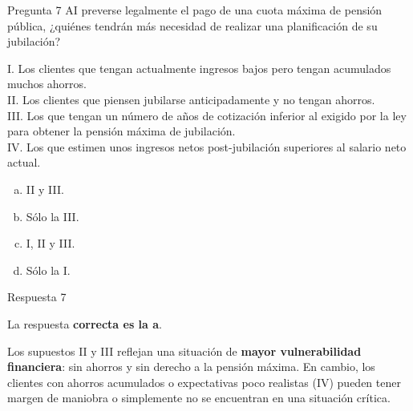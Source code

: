 \documentclass[
  ignorenonframetext,
  aspectratio=54,
  spanish,
]{beamer}
\providecommand{\tightlist}{%
  \setlength{\itemsep}{0pt}\setlength{\parskip}{0pt}}
\begin{document}
\begin{frame}{Pregunta 7}
\label{pregunta-7}
AI preverse legalmente el pago de una cuota máxima de pensión pública,
¿quiénes tendrán más necesidad de realizar una planificación de su
jubilación?

I. Los clientes que tengan actualmente ingresos bajos pero tengan
acumulados muchos ahorros.\\
II. Los clientes que piensen jubilarse anticipadamente y no tengan
ahorros.\\
III. Los que tengan un número de años de cotización inferior al exigido
por la ley para obtener la pensión máxima de jubilación.\\
IV. Los que estimen unos ingresos netos post-jubilación superiores al
salario neto actual.

\begin{enumerate}
[a.]
\tightlist
\item
  II y III.
\item
  Sólo la III.
\item
  I, II y III.
\item
  Sólo la I.
\end{enumerate}
\end{frame}

\begin{frame}{Respuesta 7}
\label{respuesta-7}
\begin{tcolorbox}[enhanced jigsaw, rightrule=.15mm, colback=white, arc=.35mm, colframe=quarto-callout-tip-color-frame, leftrule=.75mm, bottomrule=.15mm, left=2mm, toprule=.15mm, opacityback=0, breakable]
\begin{minipage}[t]{5.5mm}
\textcolor{quarto-callout-tip-color}{\faLightbulb}
\end{minipage}%
\begin{minipage}[t]{\textwidth - 5.5mm}

La respuesta \textbf{correcta es la a}.

Los supuestos II y III reflejan una situación de \textbf{mayor
vulnerabilidad financiera}: sin ahorros y sin derecho a la pensión
máxima. En cambio, los clientes con ahorros acumulados o expectativas
poco realistas (IV) pueden tener margen de maniobra o simplemente no se
encuentran en una situación crítica.

\end{minipage}%
\end{tcolorbox}
\end{frame}
\end{document}
